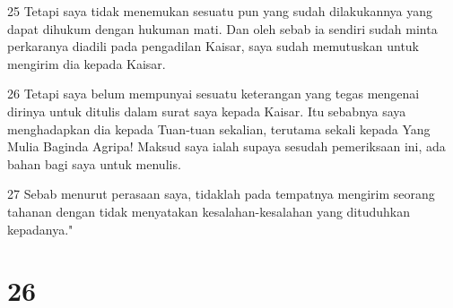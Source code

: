 \par 25 Tetapi saya tidak menemukan sesuatu pun yang sudah dilakukannya yang dapat dihukum dengan hukuman mati. Dan oleh sebab ia sendiri sudah minta perkaranya diadili pada pengadilan Kaisar, saya sudah memutuskan untuk mengirim dia kepada Kaisar.
\par 26 Tetapi saya belum mempunyai sesuatu keterangan yang tegas mengenai dirinya untuk ditulis dalam surat saya kepada Kaisar. Itu sebabnya saya menghadapkan dia kepada Tuan-tuan sekalian, terutama sekali kepada Yang Mulia Baginda Agripa! Maksud saya ialah supaya sesudah pemeriksaan ini, ada bahan bagi saya untuk menulis.
\par 27 Sebab menurut perasaan saya, tidaklah pada tempatnya mengirim seorang tahanan dengan tidak menyatakan kesalahan-kesalahan yang dituduhkan kepadanya."

\chapter{26}

